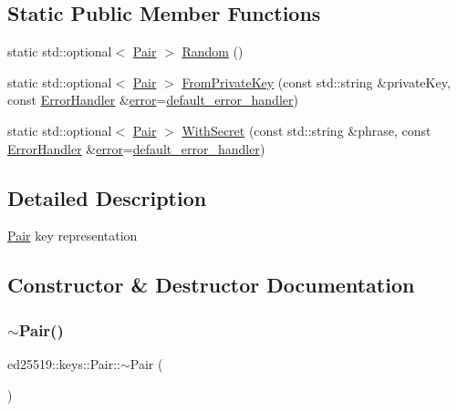 \subsection*{Static Public Member Functions}
\begin{DoxyCompactItemize}
\item 
static std\+::optional$<$ \mbox{\hyperlink{classed25519_1_1keys_1_1_pair}{Pair}} $>$ \mbox{\hyperlink{classed25519_1_1keys_1_1_pair_a56deb8f1bf6d1a51313abebd5a41d6fc}{Random}} ()
\item 
static std\+::optional$<$ \mbox{\hyperlink{classed25519_1_1keys_1_1_pair}{Pair}} $>$ \mbox{\hyperlink{classed25519_1_1keys_1_1_pair_aa4b34f7823cbba1e4243b9fbf2745e1e}{From\+Private\+Key}} (const std\+::string \&private\+Key, const \mbox{\hyperlink{namespaceed25519_a6ba572942b3c18591fc869d52a6b16e6}{Error\+Handler}} \&\mbox{\hyperlink{namespaceed25519_ac93d0b5156eaca22197055e902920bc4}{error}}=\mbox{\hyperlink{namespaceed25519_a7c7bb6ed17541162959c33ed3e3b15fb}{default\+\_\+error\+\_\+handler}})
\item 
static std\+::optional$<$ \mbox{\hyperlink{classed25519_1_1keys_1_1_pair}{Pair}} $>$ \mbox{\hyperlink{classed25519_1_1keys_1_1_pair_a3d7457b834d7e8091a61272f20132d01}{With\+Secret}} (const std\+::string \&phrase, const \mbox{\hyperlink{namespaceed25519_a6ba572942b3c18591fc869d52a6b16e6}{Error\+Handler}} \&\mbox{\hyperlink{namespaceed25519_ac93d0b5156eaca22197055e902920bc4}{error}}=\mbox{\hyperlink{namespaceed25519_a7c7bb6ed17541162959c33ed3e3b15fb}{default\+\_\+error\+\_\+handler}})
\end{DoxyCompactItemize}


\subsection{Detailed Description}
\mbox{\hyperlink{classed25519_1_1keys_1_1_pair}{Pair}} key representation 

\subsection{Constructor \& Destructor Documentation}
\mbox{\label{classed25519_1_1keys_1_1_pair_a23edc59bc943684eadbdae8ffd6c8a42}} 
\subsubsection{\texorpdfstring{$\sim$\+Pair()}{~Pair()}}
{\footnotesize\ttfamily ed25519\+::keys\+::\+Pair\+::$\sim$\+Pair (\begin{DoxyParamCaption}{ }\end{DoxyParamCaption})\hspace{0.3cm}{\ttfamily [inline]}}



